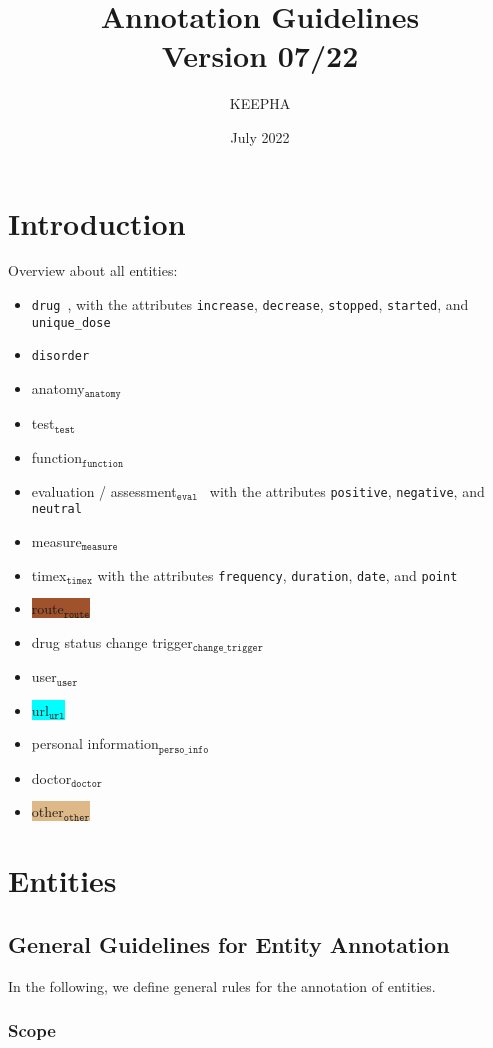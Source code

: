 \documentclass[12pt]{article}
\title{Annotation Guidelines\\ Version 07/22}
\author{KEEPHA}
\date{July 2022}
\theoremstyle{definition}
\newcommand{\anatomy}[1]{\colorbox{dollarbill}{#1$_{\texttt{anatomy}}$}\ }
\newcommand{\test}[1]{\colorbox{asparagus}{#1$_{\texttt{test}}$}\ }
\newcommand{\function}[1]{\colorbox{banana}{#1$_{\texttt{function}}$}\ }
\newcommand{\eval}[1]{\colorbox{babyblue}{#1$_{\texttt{eval}}$}\ }
\newcommand{\measure}[1]{\colorbox{bittersweet}{#1$_{\texttt{measure}}$}\ }
\newcommand{\timex}[2]{\colorbox{ashgrey}{#1$_{\texttt{timex}}$}}
\newcommand{\route}[1]{\colorbox{sienna}{#1$_{\texttt{route}}$}\ }
\newcommand{\trigger}[1]{\colorbox{celadon}{#1$_{\texttt{change\_trigger}}$}\ }
\newcommand{\other}[1]{\colorbox{burlywood}{#1$_{\texttt{other}}$}\ }
\newcommand{\user}[1]{\colorbox{chestnut}{#1$_{\texttt{user}}$}\ }
\newcommand{\link}[1]{\colorbox{cyan}{#1$_{\texttt{url}}$}\ }
\newcommand{\info}[1]{\colorbox{heliotrope}{#1$_{\texttt{perso\_info}}$}\ }
\newcommand{\doctor}[1]{\colorbox{indianyellow}{#1$_{\texttt{doctor}}$}\ }
\newcommand{\dis}{\texttt{disorder}\ }
\newcommand{\dr}{\texttt{drug}\ }
\begin{document}
\maketitle

\tableofcontents
\clearpage

\section{Introduction}
Overview about all entities:

\begin{itemize}
    \item \dr, with the attributes \texttt{increase}, \texttt{decrease}, \texttt{stopped}, \texttt{started}, and \texttt{unique\_dose}
    \item \dis
    \item \anatomy{anatomy}
    \item \test{test}
    \item \function{function}
    \item \eval{evaluation / assessment} with the attributes \texttt{positive}, \texttt{negative}, and \texttt{neutral}
    \item \measure{measure}
    \item \timex{timex}, with the attributes \texttt{frequency}, \texttt{duration}, \texttt{date}, and \texttt{point}
    \item \route{route}
    \item \trigger{drug status change trigger}
    \item \user{user}
    \item \link{url}
    \item \info{personal information}
    \item \doctor{doctor}
    \item \other{other}
\end{itemize}


\section{Entities}


\subsection{General Guidelines for Entity Annotation}

In the following, we define general rules for the annotation of entities.

\subsubsection*{Scope}
\end{document}
